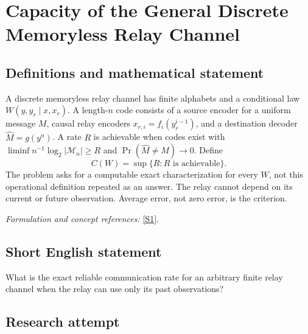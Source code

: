 \documentclass[11pt,a4paper]{article}
\newcommand{\sref}[2]{\hyperlink{source:#1:#2}{[S#2]}}
\newif\ifshowcatalogue
\newcommand{\cataloguescope}[1]{\ifshowcatalogue
 \paragraph{Exact scope in the supplied catalogue.}
 \begin{quote}\small #1\end{quote}\fi}
\numberwithin{equation}{section}
\begin{document}
\setcounter{section}{0}
\clearpage
\section*{\texorpdfstring{Capacity of the General Discrete Memoryless Relay Channel}{Capacity of the General Discrete Memoryless Relay Channel}}\label{30006765}
\subsection{Definitions and mathematical statement}
A discrete memoryless relay channel has finite alphabets and a conditional law $W(y,y_r\mid x,x_r)$. A length-$n$ code consists of a source encoder for a uniform message $M$, causal relay encoders $x_{r,i}=f_i(y_r^{i-1})$, and a destination decoder $\widehat M=g(y^n)$. A rate $R$ is achievable when codes exist with $\liminf n^{-1}\log_2|\mathcal M_n|\ge R$ and $\Pr(\widehat M\ne M)\to0$. Define
\[
 C(W)=\sup\{R:R\text{ is achievable}
 \}.
\]
The problem asks for a computable exact characterization for every $W$, not this operational definition repeated as an answer. The relay cannot depend on its current or future observation. Average error, not zero error, is the criterion.
\par\smallskip\textit{Formulation and concept references:} \sref{30006765}{1}.
\cataloguescope{Find a computable exact average-error Shannon-capacity characterization for every finite-alphabet discrete memoryless relay channel with law p(y,y\_r|x,x\_r), where the relay input at time i depends only on its observations before time i.}
\subsection{Short English statement}
What is the exact reliable communication rate for an arbitrary finite relay channel when the relay can use only its past observations?
\subsection{Research attempt}
\end{document}
